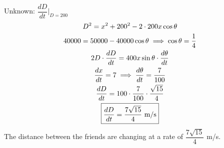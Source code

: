 \documentclass[12pt]{article}
\newcommand{\dxdt}{\dfrac{dx}{dt}}
\begin{document}
Unknown: $\dfrac{dD}{dt} \Big|_{D=200}$
\begin{gather*}
    D^2=x^2+200^2-2\cdot 200 x \cos \theta\\
    40000=50000-40000\cos \theta \implies \cos \theta =\frac{1}{4}\\
    2D \cdot \frac{dD}{dt} = 400 x \sin \theta \cdot \frac{d\theta}{dt}\\
    \dxdt = 7 \implies \frac{d\theta}{dt}=\frac{7}{100}\\
    \frac{dD}{dt}= 100\cdot \frac{7}{100}\cdot \frac{\sqrt{15}}{4}\\
    \boxed{\frac{dD}{dt}=\frac{7\sqrt{15}}{4} $ m/s$}
\end{gather*}
The distance between the friends are changing at a rate of $\dfrac{7\sqrt{15}}{4}$ m/s.
\end{document}
